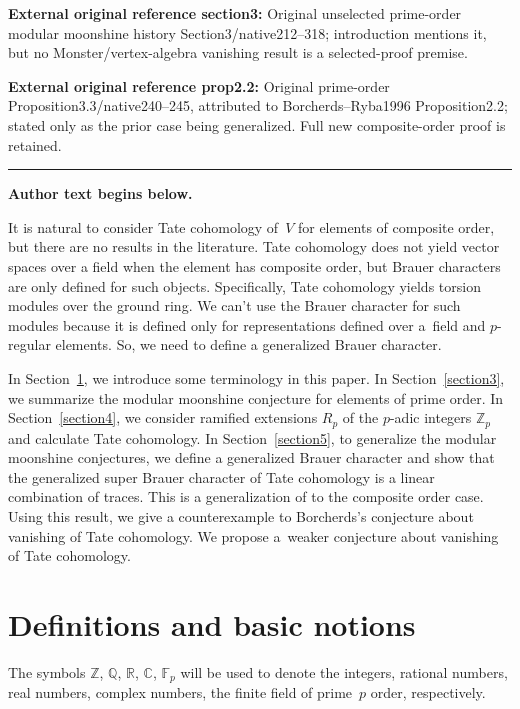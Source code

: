 \documentclass[11pt]{article}
\numberwithin{equation}{section}
\numberwithin{equation}{section}
\begin{document}
\noindent\textbf{External original reference section3:} Original unselected prime-order modular moonshine history Section3/native212–318; introduction mentions it, but no Monster/vertex-algebra vanishing result is a selected-proof premise.\par
\noindent\textbf{External original reference prop2.2:} Original prime-order Proposition3.3/native240–245, attributed to Borcherds–Ryba1996 Proposition2.2; stated only as the prior case being generalized. Full new composite-order proof is retained.\par
\medskip\hrule\medskip\noindent\textbf{Author text begins below.}\par
\setcounter{section}{1}
It is natural to consider Tate cohomology of~$V$ for elements of composite order, but there are no results in the literature. Tate cohomology does not yield vector spaces over a field when the element has composite order, but Brauer characters are only defined for such objects. Specifically, Tate cohomology yields torsion modules over the ground ring. We can't use the Brauer character for such modules because it is defined only for representations defined over a~field and $p$-regular elements. So, we need to define a generalized Brauer character.

In Section~\ref{section2}, we introduce some terminology in this paper. In Section~\ref{section3}, we summarize the modular moonshine conjecture for elements of prime order. In Section~\ref{section4}, we consider ramified extensions $R_p$ of the $p$-adic integers $\mathbb{Z}_p$ and calculate Tate cohomology. In Section~\ref{section5}, to generalize the modular moonshine conjectures, we define a generalized Brauer character and show that the generalized super Brauer character of Tate cohomology is a linear combination of traces. This is a generalization of \cite[Proposition~2.2]{BR} to the composite order case. Using this result, we give a counterexample to Borcherds's conjecture about vanishing of Tate cohomology. We propose a~weaker conjecture about vanishing of Tate cohomology.


\section{Definitions and basic notions}\label{section2}
 The symbols $\mathbb{Z}$, $\mathbb{Q}$, $\mathbb{R}$, $\mathbb{C}$, $\mathbb{F}_p$ will be used to denote the integers, rational numbers, real numbers, complex numbers, the finite field of prime~$p$ order, respectively.
\end{document}
